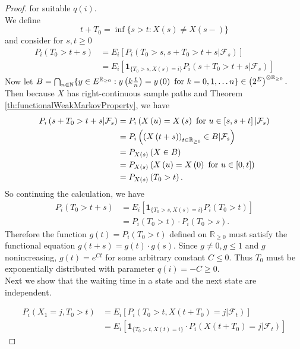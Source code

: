 \documentclass[12pt,a4paper]{scrartcl}
\numberwithin{equation}{section}
\newcommand{\R}{\mathbb{R}} %
\newcommand{\N}{\mathbb{N}} %
\begin{document}
\begin{proof}
for suitable $q\left(i\right)$.\\[2ex]
We define
$$ t + T_0 = \inf\lbrace s > t: X\left(s\right) \neq X\left(s-\right)\rbrace  $$ and consider for $s,t \geq 0$
\begin{align*}
P_i\left(T_0 > t+s\right) &= E_i\left[ P_i\left(T_0 > s , s+T_0 > t+s | \mathcal{F}_s \right) \right] \\
&= E_i\left[\textbf{1}_{\lbrace T_0 > s, X\left(s\right) = i \rbrace} P_i\left(s+T_0 > t+s   | \mathcal{F}_s \right) \right]
\end{align*}
Now let $B = \bigcap_{n \in \N} \lbrace y \in E^{\R_{\geq 0}}: y\left(k \frac{t}{n} \right) = y\left(0\right) \textnormal{ for } k=0,1,\ldots n \rbrace  \in \left(2^{E} \right)^{\otimes \R_{\geq 0}}.$
Then because $X$ has right-continuous sample paths and Theorem \ref{th:functionalWeakMarkovProperty}, we have
\begin{align*}
P_i\left(s+T_0 > t+s | \mathcal{F}_s \right) &= P_i\left(X\left(u\right) = X\left(s\right) \textnormal{ for } u \in \left[s,s+t \right] |\mathcal{F}_s\right) \\
&= P_i\left(\left(X\left(t+s\right) \right)_{t \in \R_{\geq 0}} \in B  | \mathcal{F}_s \right) \\
&= P_{X\left(s\right)}\left(X \in B \right) \\
&=P_{X\left(s\right)}\left(X\left(u\right) = X\left(0\right) \textnormal{ for } u \in \left[0,t\right] \right)\\
&= P_{X\left(s\right)}\left(T_0 > t\right).
\end{align*}
So continuing the calculation, we have
\begin{align*}
P_i\left(T_0 > t+s\right) &= E_i\left[\textbf{1}_{\lbrace T_0 > s, X\left(s\right) = i \rbrace} P_i\left(T_0 > t\right) \right] \\
&=P_i\left(T_0 > t\right) \cdot P_i\left(T_0 > s\right).
\end{align*}
Therefore the function $g\left(t\right) = P_i\left(T_0 > t\right)$ defined on $\R_{\geq 0}$ must satisfy the functional equation $g\left(t+s\right) = g\left(t\right) \cdot g\left(s\right).$ Since $g \neq 0, g \leq 1$ and $g$ nonincreasing, $g\left(t\right) = e^{Ct}$ for some arbitrary constant $C \leq 0.$
Thus $T_0$ must be exponentially distributed with parameter $ q\left(i\right) = -C \geq 0 $. \\
Next we show that the waiting time in a state and the next state are independent.

\begin{align*}
P_i\left(X_1 = j, T_0 > t\right) &= E_i\left[P_i\left( T_0 > t, X\left(t+T_0\right) = j | \mathcal{F}_t\right)\right] \\
&= E_i\left[\textbf{1}_{\lbrace T_0 > t, X\left(t\right) = i\rbrace } \cdot P_i\left( X\left(t+T_0\right) = j | \mathcal{F}_t\right) \right]
\end{align*}


\end{proof}
\end{document}
